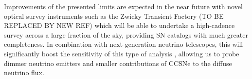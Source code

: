 \documentclass[twocolumn, tighten, linenumbers]{aastex62}
\begin{document}

Improvements of the presented limits are expected in the near future with novel optical survey instruments such as the Zwicky Transient Factory \citep{2014htu..conf...27B} (TO BE REPLACED BY NEW REF) which will be able to undertake a high-cadence survey across a large fraction of the sky, providing SN catalogs with much greater completeness. In combination with next-generation neutrino telescopes, this will significantly boost the sensitivity of this type of analysis , allowing us to probe dimmer neutrino emitters and smaller contributions of CCSNe to the diffuse neutrino flux.

 

\appendix
\end{document}
